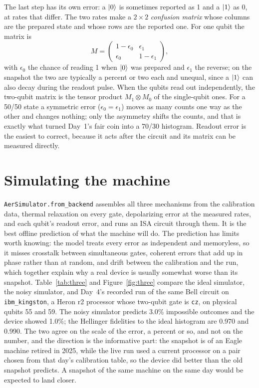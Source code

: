 \documentclass[11pt]{article}
\newcommand{\code}[1]{\texttt{#1}}
\begin{document}
The last step has its own error: a $\ket{0}$ is sometimes reported as 1 and a $\ket{1}$ as 0, at rates that differ. The two rates make a $2\times2$ \emph{confusion matrix} whose columns are the prepared state and whose rows are the reported one. For one qubit the matrix is
\begin{equation}
M = \begin{pmatrix}1 - \epsilon_0 & \epsilon_1\\ \epsilon_0 & 1 - \epsilon_1\end{pmatrix},
\label{eq:confusion}
\end{equation}
with $\epsilon_0$ the chance of reading 1 when $\ket{0}$ was prepared and $\epsilon_1$ the reverse; on the snapshot the two are typically a percent or two each and unequal, since a $\ket{1}$ can also decay during the readout pulse. When the qubits read out independently, the two-qubit matrix is the tensor product $M_1\otimes M_0$ of the single-qubit ones. For a 50/50 state a symmetric error ($\epsilon_0 = \epsilon_1$) moves as many counts one way as the other and changes nothing; only the asymmetry shifts the counts, and that is exactly what turned Day~1's fair coin into a 70/30 histogram. Readout error is the easiest to correct, because it acts after the circuit and its matrix can be measured directly.

\section{Simulating the machine}

\code{AerSimulator.from\_backend} assembles all three mechanisms from the calibration data, thermal relaxation on every gate, depolarizing error at the measured rates, and each qubit's readout error, and runs an ISA circuit through them. It is the best offline prediction of what the machine will do. The prediction has limits worth knowing: the model treats every error as independent and memoryless, so it misses crosstalk between simultaneous gates, coherent errors that add up in phase rather than at random, and drift between the calibration and the run, which together explain why a real device is usually somewhat worse than its snapshot. Table~\ref{tab:three} and Figure~\ref{fig:three} compare the ideal simulator, the noisy simulator, and Day~4's recorded run of the same Bell circuit on \code{ibm\_kingston}, a Heron r2 processor whose two-qubit gate is \code{cz}, on physical qubits 55 and 59. The noisy simulator predicts 3.0\% impossible outcomes and the device showed 1.0\%; the Hellinger fidelities to the ideal histogram are 0.970 and 0.990. The two agree on the scale of the error, a percent or so, and not on the number, and the direction is the informative part: the snapshot is of an Eagle machine retired in 2025, while the live run used a current processor on a pair chosen from that day's calibration table, so the device did better than the old snapshot predicts. A snapshot of the same machine on the same day would be expected to land closer.
\end{document}
